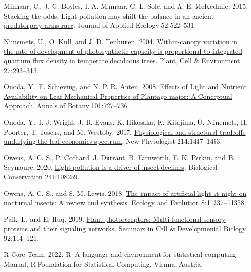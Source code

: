 \documentclass[
  12pt,
  letterpaper,
  DIV=11,
  numbers=noendperiod]{scrartcl}
\newlength{\cslhangindent}
\newlength{\cslentryspacingunit} %
\newenvironment{CSLReferences}[2] %
 {%
  \setlength{\parindent}{0pt}
  \ifodd #1
  \let\oldpar\par
  \def\par{\hangindent=\cslhangindent\oldpar}
  \fi
  \setlength{\parskip}{#2\cslentryspacingunit}
 }%
 {}
\begin{document}
\begin{CSLReferences}{1}{0}
\leavevmode{}%
Minnaar, C., J. G. Boyles, I. A. Minnaar, C. L. Sole, and A. E.
McKechnie. 2015. \href{https://doi.org/10.1111/1365-2664.12381}{Stacking
the odds: Light pollution may shift the balance in an ancient
predator\textendash prey arms race}. Journal of Applied Ecology
52:522--531.

\leavevmode{}%
Niinemets, Ü., O. Kull, and J. D. Tenhunen. 2004.
\href{https://doi.org/10.1111/j.1365-3040.2003.01143.x}{Within-canopy
variation in the rate of development of photosynthetic capacity is
proportional to integrated quantum flux density in temperate deciduous
trees}. Plant, Cell \& Environment 27:293--313.

\leavevmode{}%
Onoda, Y., F. Schieving, and N. P. R. Anten. 2008.
\href{https://doi.org/10.1093/aob/mcn013}{Effects of {Light} and
{Nutrient Availability} on {Leaf Mechanical Properties} of {Plantago}
major: {A Conceptual Approach}}. Annals of Botany 101:727--736.

\leavevmode{}%
Onoda, Y., I. J. Wright, J. R. Evans, K. Hikosaka, K. Kitajima, Ü.
Niinemets, H. Poorter, T. Tosens, and M. Westoby. 2017.
\href{https://doi.org/10.1111/nph.14496}{Physiological and structural
tradeoffs underlying the leaf economics spectrum}. New Phytologist
214:1447--1463.

\leavevmode{}%
Owens, A. C. S., P. Cochard, J. Durrant, B. Farnworth, E. K. Perkin, and
B. Seymoure. 2020.
\href{https://doi.org/10.1016/j.biocon.2019.108259}{Light pollution is a
driver of insect declines}. Biological Conservation 241:108259.

\leavevmode{}%
Owens, A. C. S., and S. M. Lewis. 2018.
\href{https://doi.org/10.1002/ece3.4557}{The impact of artificial light
at night on nocturnal insects: {A} review and synthesis}. Ecology and
Evolution 8:11337--11358.

\leavevmode{}%
Paik, I., and E. Huq. 2019.
\href{https://doi.org/10.1016/j.semcdb.2019.03.007}{Plant
photoreceptors: {Multi-functional} sensory proteins and their signaling
networks}. Seminars in Cell \& Developmental Biology 92:114--121.

\leavevmode{}%
R Core Team. 2022. R: {A} language and environment for statistical
computing. Manual, {R Foundation for Statistical Computing}, {Vienna,
Austria}.


\end{CSLReferences}
\end{document}
